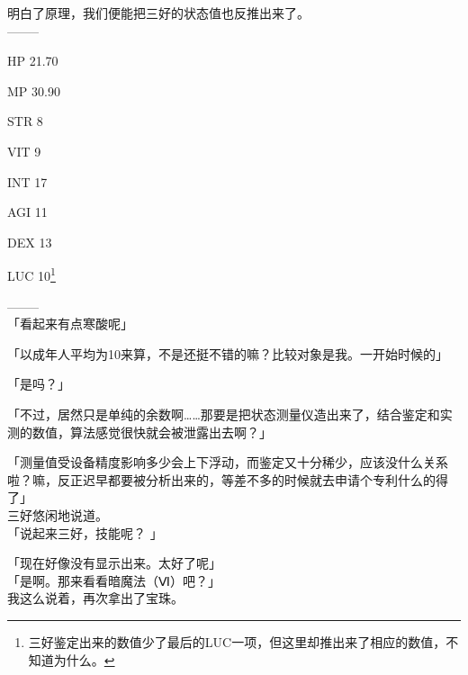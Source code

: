 明白了原理，我们便能把三好的状态值也反推出来了。\\

  --------

  HP 21.70

  MP 30.90

%  


  STR 8

  VIT 9

  INT 17

  AGI 11

  DEX 13

  LUC 10\footnote{三好鉴定出来的数值少了最后的LUC一项，但这里却推出来了相应的数值，不知道为什么。}

  --------\\

「看起来有点寒酸呢」

「以成年人平均为10来算，不是还挺不错的嘛？比较对象是我。一开始时候的」

「是吗？」

「不过，居然只是单纯的余数啊……那要是把状态测量仪造出来了，结合鉴定和实测的数值，算法感觉很快就会被泄露出去啊？」

「测量值受设备精度影响多少会上下浮动，而鉴定又十分稀少，应该没什么关系啦？嘛，反正迟早都要被分析出来的，等差不多的时候就去申请个专利什么的得了」\\

三好悠闲地说道。\\

「说起来三好，技能呢？ 」

「现在好像没有显示出来。太好了呢」\\

「是啊。那来看看暗魔法（Ⅵ）吧？」\\

我这么说着，再次拿出了宝珠。\\
